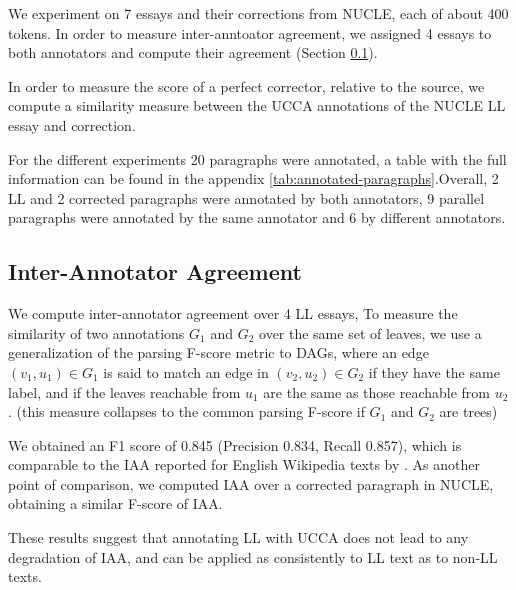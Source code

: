 \documentclass[letter,11pt]{article}
\begin{document}
		We experiment on 7 essays and their corrections from NUCLE, each of about 400 tokens.
		In order to measure inter-anntoator agreement, we assigned 4 essays to both annotators
		and compute their agreement (Section \ref{sec:iaa}).
		
		In order to measure the score
		of a perfect corrector, relative to the source, we compute a similarity measure
		between the UCCA annotations of the NUCLE LL essay and correction.
		
		For the different experiments 20 paragraphs were annotated, a table with the full
		information can be found in the appendix \ref{tab:annotated-paragraphs}.Overall, 2 LL
		and 2 corrected paragraphs were annotated by both annotators, 9 parallel paragraphs were
		annotated by the same annotator and 6 by different annotators.
		
		\subsection{Inter-Annotator Agreement}\label{sec:iaa}
		
		We compute inter-annotator agreement over 4 LL essays, 
		To measure the similarity of two annotations $G_1$ and $G_2$ over the same set of leaves,
		we use a generalization of the parsing F-score metric to DAGs, where an
		edge $(v_1,u_1) \in G_1$ is said to match an edge in $(v_2,u_2) \in G_2$ if
		they have the same label, and if the leaves
		reachable from $u_1$ are the same as those reachable from $u_2$. 
		(this measure collapses to the common parsing F-score if $G_1$ and $G_2$ are trees)
		
		We obtained an F1 score of 0.845 (Precision 0.834, Recall 0.857), which
		is comparable to the IAA reported for English Wikipedia texts by \cite{abend2013universal}.
		As another point of comparison, we computed IAA over a corrected paragraph in NUCLE,
		obtaining a similar F-score of IAA.
		
		These results suggest that annotating LL with UCCA does not lead to any degradation
		of IAA, and can be applied as consistently to LL text as to non-LL texts.
		
		
\end{document}
